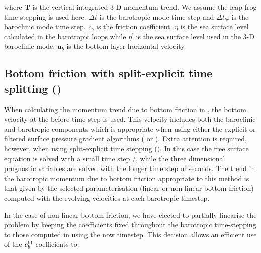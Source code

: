 \documentclass[../main/NEMO_manual]{subfiles}
\begin{document}
where $\textbf{T}$ is the vertical integrated 3-D momentum trend.
We assume the leap-frog time-stepping is used here.
$\Delta t$ is the barotropic mode time step and $\Delta t_{bc}$ is the baroclinic mode time step.
$c_{b}$ is the friction coefficient.
$\eta$ is the sea surface level calculated in the barotropic loops while $\eta^{'}$ is the sea surface level used in
the 3-D baroclinic mode.
$\textbf{u}_{b}$ is the bottom layer horizontal velocity.

\subsection[Bottom friction w/ split-explicit time splitting (\protect\np{ln\_bfrimp})]
				{Bottom friction with split-explicit time splitting (\protect{})}
\label{subsec:ZDF_bfr_ts}

When calculating the momentum trend due to bottom friction in ,
the bottom velocity at the before time step is used.
This velocity includes both the baroclinic and barotropic components which is appropriate when
using either the explicit or filtered surface pressure gradient algorithms
( or ).
Extra attention is required, however, when using split-explicit time stepping ().
In this case the free surface equation is solved with a small time step /,
while the three dimensional prognostic variables are solved with the longer time step of  seconds.
The trend in the barotropic momentum due to bottom friction appropriate to this method is that given by
the selected parameterisation (\ie linear or non-linear bottom friction) computed with
the evolving velocities at each barotropic timestep. 

In the case of non-linear bottom friction, we have elected to partially linearise the problem by
keeping the coefficients fixed throughout the barotropic time-stepping to those computed in
 using the now timestep.
This decision allows an efficient use of the $c_b^{\mathbf{U}}$ coefficients to:
\end{document}
